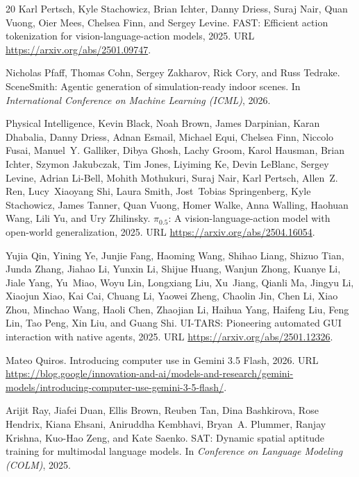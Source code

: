 \documentclass{article}
\begin{document}
\begin{thebibliography}{20}
Karl Pertsch, Kyle Stachowicz, Brian Ichter, Danny Driess, Suraj Nair, Quan Vuong, Oier Mees, Chelsea Finn, and Sergey Levine.
\newblock FAST: Efficient action tokenization for vision-language-action models, 2025.
\newblock URL \url{https://arxiv.org/abs/2501.09747}.

Nicholas Pfaff, Thomas Cohn, Sergey Zakharov, Rick Cory, and Russ Tedrake.
\newblock SceneSmith: Agentic generation of simulation-ready indoor scenes.
\newblock In \emph{International Conference on Machine Learning (ICML)}, 2026.

Physical Intelligence, Kevin Black, Noah Brown, James Darpinian, Karan Dhabalia, Danny Driess, Adnan Esmail, Michael Equi, Chelsea Finn, Niccolo Fusai, Manuel~Y. Galliker, Dibya Ghosh, Lachy Groom, Karol Hausman, Brian Ichter, Szymon Jakubczak, Tim Jones, Liyiming Ke, Devin LeBlanc, Sergey Levine, Adrian Li-Bell, Mohith Mothukuri, Suraj Nair, Karl Pertsch, Allen~Z. Ren, Lucy~Xiaoyang Shi, Laura Smith, Jost~Tobias Springenberg, Kyle Stachowicz, James Tanner, Quan Vuong, Homer Walke, Anna Walling, Haohuan Wang, Lili Yu, and Ury Zhilinsky.
\newblock $\pi_{0.5}$: A vision-language-action model with open-world generalization, 2025.
\newblock URL \url{https://arxiv.org/abs/2504.16054}.

Yujia Qin, Yining Ye, Junjie Fang, Haoming Wang, Shihao Liang, Shizuo Tian, Junda Zhang, Jiahao Li, Yunxin Li, Shijue Huang, Wanjun Zhong, Kuanye Li, Jiale Yang, Yu~Miao, Woyu Lin, Longxiang Liu, Xu~Jiang, Qianli Ma, Jingyu Li, Xiaojun Xiao, Kai Cai, Chuang Li, Yaowei Zheng, Chaolin Jin, Chen Li, Xiao Zhou, Minchao Wang, Haoli Chen, Zhaojian Li, Haihua Yang, Haifeng Liu, Feng Lin, Tao Peng, Xin Liu, and Guang Shi.
\newblock UI-TARS: Pioneering automated GUI interaction with native agents, 2025.
\newblock URL \url{https://arxiv.org/abs/2501.12326}.

Mateo Quiros.
\newblock Introducing computer use in Gemini 3.5 Flash, 2026.
\newblock URL \url{https://blog.google/innovation-and-ai/models-and-research/gemini-models/introducing-computer-use-gemini-3-5-flash/}.

Arijit Ray, Jiafei Duan, Ellis Brown, Reuben Tan, Dina Bashkirova, Rose Hendrix, Kiana Ehsani, Aniruddha Kembhavi, Bryan~A. Plummer, Ranjay Krishna, Kuo-Hao Zeng, and Kate Saenko.
\newblock SAT: Dynamic spatial aptitude training for multimodal language models.
\newblock In \emph{Conference on Language Modeling (COLM)}, 2025.


\end{thebibliography}
\end{document}
